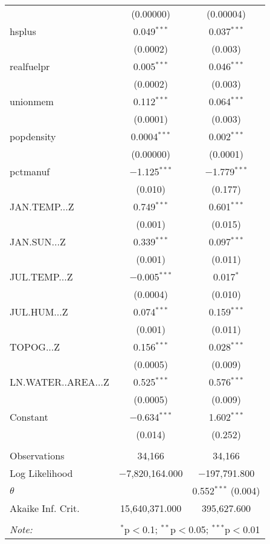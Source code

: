 \begin{table}[!htbp]
\begin{tabular}{@{\extracolsep{5pt}}lcc}
  & (0.00000) & (0.00004) \\ 
  hsplus & 0.049$^{***}$ & 0.037$^{***}$ \\ 
  & (0.0002) & (0.003) \\ 
  realfuelpr & 0.005$^{***}$ & 0.046$^{***}$ \\ 
  & (0.0002) & (0.003) \\ 
  unionmem & 0.112$^{***}$ & 0.064$^{***}$ \\ 
  & (0.0001) & (0.003) \\ 
  popdensity & 0.0004$^{***}$ & 0.002$^{***}$ \\ 
  & (0.00000) & (0.0001) \\ 
  pctmanuf & $-$1.125$^{***}$ & $-$1.779$^{***}$ \\ 
  & (0.010) & (0.177) \\ 
  JAN.TEMP...Z & 0.749$^{***}$ & 0.601$^{***}$ \\ 
  & (0.001) & (0.015) \\ 
  JAN.SUN...Z & 0.339$^{***}$ & 0.097$^{***}$ \\ 
  & (0.001) & (0.011) \\ 
  JUL.TEMP...Z & $-$0.005$^{***}$ & 0.017$^{*}$ \\ 
  & (0.0004) & (0.010) \\ 
  JUL.HUM...Z & 0.074$^{***}$ & 0.159$^{***}$ \\ 
  & (0.001) & (0.011) \\ 
  TOPOG...Z & 0.156$^{***}$ & 0.028$^{***}$ \\ 
  & (0.0005) & (0.009) \\ 
  LN.WATER..AREA...Z & 0.525$^{***}$ & 0.576$^{***}$ \\ 
  & (0.0005) & (0.009) \\ 
  Constant & $-$0.634$^{***}$ & 1.602$^{***}$ \\ 
  & (0.014) & (0.252) \\ 
 \hline \\[-1.8ex] 
Observations & 34,166 & 34,166 \\ 
Log Likelihood & $-$7,820,164.000 & $-$197,791.800 \\ 
$\theta$ &  & 0.552$^{***}$  (0.004) \\ 
Akaike Inf. Crit. & 15,640,371.000 & 395,627.600 \\ 
\hline 
\hline \\[-1.8ex] 
\textit{Note:}  & \multicolumn{2}{r}{$^{*}$p$<$0.1; $^{**}$p$<$0.05; $^{***}$p$<$0.01} \\ 
\end{tabular} 
\end{table} 
